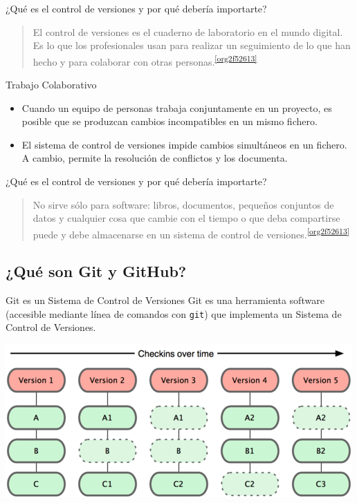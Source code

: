 \documentclass[xcolor={usenames,svgnames,dvipsnames}]{beamer}
\begin{document}
\begin{frame}[label={sec:org07517cc}]{¿Qué es el control de versiones y por qué debería importarte?}
\begin{quote}
El control de versiones es el \alert{cuaderno de laboratorio} en el mundo digital. Es lo que los profesionales usan para realizar un
\alert{seguimiento} de lo que han hecho y para \alert{colaborar} con otras
personas.\textsuperscript{\ref{org2f52613}}
\end{quote}

\begin{block}{Trabajo Colaborativo}
\begin{itemize}
\item Cuando un equipo de personas trabaja conjuntamente en un proyecto, es posible que se produzcan cambios incompatibles en un mismo fichero.
\item El sistema de control de versiones \alert{impide} cambios simultáneos en un fichero. A cambio, permite la \alert{resolución de conflictos} y los documenta.
\end{itemize}
\end{block}
\end{frame}

\begin{frame}[label={sec:orgcb82b59}]{¿Qué es el control de versiones y por qué debería importarte?}
\begin{quote}
\alert{No sirve sólo para software}: libros, documentos, pequeños conjuntos
de datos y cualquier cosa que cambie con el tiempo o que deba
compartirse puede y debe almacenarse en un sistema de control de
versiones.\textsuperscript{\ref{org2f52613}}
\end{quote}
\end{frame}

\subsection{¿Qué son Git y GitHub?}
\label{sec:org8a4f771}

\begin{frame}[label={sec:orge599280},fragile]{Git es un Sistema de Control de Versiones}
 Git es una herramienta software (accesible mediante línea de comandos con \texttt{git}) que implementa un Sistema de Control de Versiones.

\begin{center}
\includegraphics[width=.9\linewidth]{figs/git_model.png}
\end{center}
\end{frame}
\end{document}

